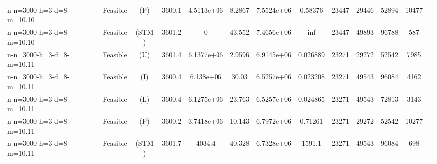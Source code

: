 \documentclass[landscape, a4paper]{article}
\newcommand{\STM}{\ensuremath{\mathrm{STM}}}
\newcommand{\Improved}{\ensuremath{\mathrm{I}}}
\newcommand{\Loose}{\ensuremath{\mathrm{L}}}
\newcommand{\Profit}{\ensuremath{\mathrm{P}}}
\newcommand{\Utility}{\ensuremath{\mathrm{U}}}
\begin{document}
\begin{center}
\begin{tabular}{lcccccccccccc}
n-n=3000-h=3-d=8-m=10.10 & Feasible & (\Profit) & 3600.1 & 4.5113e+06 & 8.2867 & 7.5524e+06 & 0.58376 & 23447 & 29446 & 52894 & 10477 & \\
n-n=3000-h=3-d=8-m=10.10 & Feasible & (\STM) & 3601.2 & 0 & 43.552 & 7.4656e+06 & inf & 23447 & 49893 & 96788 & 587 & \\
n-n=3000-h=3-d=8-m=10.11 & Feasible & (\Utility) & 3601.4 & 6.1377e+06 & 2.9596 & 6.9145e+06 & 0.026889 & 23271 & 29272 & 52542 & 7985 & \\
n-n=3000-h=3-d=8-m=10.11 & Feasible & (\Improved) & 3600.4 & 6.138e+06 & 30.03 & 6.5257e+06 & 0.023208 & 23271 & 49543 & 96084 & 4162 & \\
n-n=3000-h=3-d=8-m=10.11 & Feasible & (\Loose) & 3600.4 & 6.1275e+06 & 23.763 & 6.5257e+06 & 0.024865 & 23271 & 49543 & 72813 & 3143 & \\
n-n=3000-h=3-d=8-m=10.11 & Feasible & (\Profit) & 3600.2 & 3.7418e+06 & 10.143 & 6.7972e+06 & 0.71261 & 23271 & 29272 & 52542 & 10277 & \\
n-n=3000-h=3-d=8-m=10.11 & Feasible & (\STM) & 3601.7 & 4034.4 & 40.328 & 6.7328e+06 & 1591.1 & 23271 & 49543 & 96084 & 698 & \\
\end{tabular}
\end{center}
\end{document}
